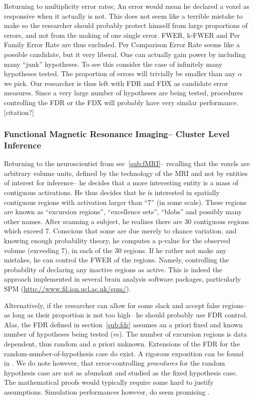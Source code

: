 \documentclass[review,12pt]{article}
\begin{document}
Returning to multiplicity error rates; An error would mean he declared a voxel as responsive when it actually is not. This does not seem like a terrible mistake to make so the researcher should probably protect himself from large proportions of errors, and not from the making of one single error. FWER, k-FWER and Per Family Error Rate are thus excluded. Per Comparison Error Rate seems like a possible candidate, but it very liberal. One can actually gain power by including many ``junk'' hypotheses. To see this consider the case of infinitely many hypotheses tested. The proportion of errors will trivially be smaller than any $\alpha$ we pick. Our researcher is thus left with FDR and FDX as candidate error measures. Since a very large number of hypotheses are being tested, procedures controlling the FDR or the FDX will probably have very similar performance. [citation?]


\subsubsection{Functional Magnetic Resonance Imaging-- Cluster Level Inference}

Returning to the neuroscientist from sec~\ref{sub:fMRI}-- recalling that the voxels are arbitrary volume units, defined by the technology of the MRI and not by entities of interest for inference-- he decides that a more interesting entity is a mass of contiguous activations. He thus decides that he is interested in spatially contiguous regions with activation larger than ``7'' (in some scale). These regions are known as ``excursion regions'', ``excellence sets'', ``blobs'' and possibly many other names. 
After scanning a subject, he realizes there are 30 contiguous regions which exceed 7. Conscious that some are  due merely to chance variation, and knowing enough probability theory, he computes a p-value for the observed volume (exceeding 7), in each of the 30 regions. If he rather not make any mistakes, he can control the FWER of the regions. Namely, controlling the probability of declaring any inactive regions as active. This is indeed the approach implemented in several brain analysis software packages, particularly SPM (\url{http://www.fil.ion.ucl.ac.uk/spm/}).

Alternatively, if the researcher can allow for some slack and accept false regions-- as long as their proportion is not too high-- he should probably use FDR control. Alas, the FDR defined in section~\ref{sub:fdr} assumes an a priori fixed and known number of hypotheses being tested ($m$). The number of excursion regions is data dependent, thus random and a priori unknown. Extensions of the FDR for the random-number-of-hypothesis case do exist. A rigorous exposition can be found in  \citet{siegmund_false_2011}. We do note however, that error-controlling \emph{procedures} for the random hypothesis case are not as abundant and studied as the fixed hypothesis case. The mathematical proofs would typically require some hard to justify assumptions. Simulation performances however, do seem promising \citep{chumbley_false_2009,chumbley_topological_2010}.
\end{document}
